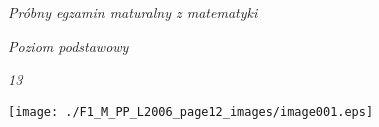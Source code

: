 \documentclass[a4paper,12pt]{article}
\begin{document}
{\it Próbny egzamin maturalny z matematyki}

{\it Poziom podstawowy}

{\it 13}
\begin{center}
\texttt{[image: ./F1\_M\_PP\_L2006\_page12\_images/image001.eps]}
\end{center}
\end{document}
